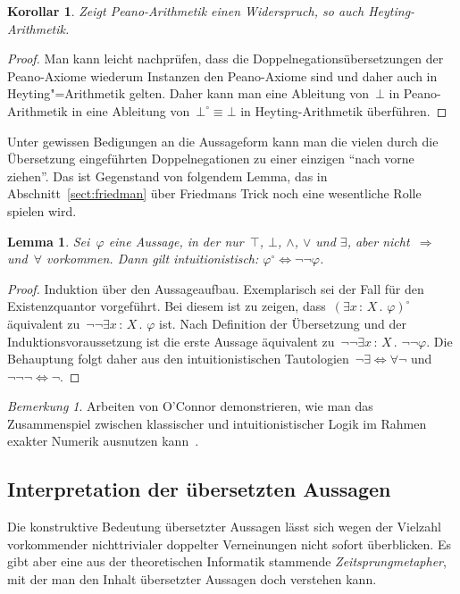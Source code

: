 \documentclass[a4paper,ngerman,12pt]{scrartcl}
\theoremstyle{definition}
\theoremstyle{plain}
\newtheorem{lemma}[defn]{Lemma}
\newtheorem{kor}[defn]{Korollar}
\theoremstyle{remark}
\newtheorem{bem}[defn]{Bemerkung}
\renewcommand{\_}{\mathpunct{.}\,}
\newcommand{\?}{\,{:}\,}
\begin{document}
\begin{kor}Zeigt Peano-Arithmetik einen Widerspruch, so auch
Heyting-Arithmetik.\end{kor}
\begin{proof}Man kann leicht nachprüfen, dass die
Doppelnegationsübersetzungen der Peano-Axiome wiederum Instanzen den
Peano-Axiome sind und daher auch in Heyting"=Arithmetik gelten. Daher kann man
eine Ableitung von~$\bot$ in Peano-Arithmetik in eine Ableitung
von~$\bot^\circ \equiv \bot$ in Heyting-Arithmetik überführen.\end{proof}

Unter gewissen Bedigungen an die Aussageform kann man die vielen durch die
Übersetzung eingeführten Doppelnegationen zu einer einzigen "`nach vorne
ziehen"'. Das ist Gegenstand von folgendem Lemma, das in
Abschnitt~\ref{sect:friedman} über Friedmans Trick noch eine wesentliche Rolle
spielen wird.
\begin{lemma}\label{dnt:geom}Sei~$\varphi$ eine Aussage, in der nur~$\top$, $\bot$,
$\wedge$, $\vee$ und $\exists$, aber nicht~$\Rightarrow$ und~$\forall$ vorkommen. Dann gilt
intuitionistisch: $\varphi^\circ \Longleftrightarrow \neg\neg\varphi$.
\end{lemma}
\begin{proof}Induktion über den Aussageaufbau. Exemplarisch sei der Fall für
den Existenzquantor vorgeführt. Bei diesem ist zu zeigen, dass~$(\exists x\?X\_
\varphi)^\circ$ äquivalent zu~$\neg\neg\exists x\?X\_ \varphi$ ist. Nach
Definition der Übersetzung und der Induktionsvoraussetzung ist die erste
Aussage äquivalent zu~$\neg\neg\exists x\?X\_ \neg\neg\varphi$. Die Behauptung
folgt daher aus den intuitionistischen Tautologien~$\neg\exists \Leftrightarrow
\forall\neg$ und~$\neg\neg\neg \Leftrightarrow \neg$.\end{proof}

\begin{bem}Arbeiten von O'Connor demonstrieren, wie man das
Zusammenspiel zwischen klassischer und intuitionistischer Logik im Rahmen
exakter Numerik ausnutzen kann~\cite{oconnor:exact,oconnor:thesis,oconnor:class}.\end{bem}


\subsection{Interpretation der übersetzten Aussagen}

Die konstruktive Bedeutung übersetzter Aussagen lässt sich wegen der Vielzahl
vorkommender nichttrivialer doppelter Verneinungen nicht sofort überblicken. Es
gibt aber eine aus der theoretischen Informatik stammende
\emph{Zeitsprungmetapher}, mit der man den Inhalt übersetzter Aussagen doch
verstehen kann.
\end{document}
